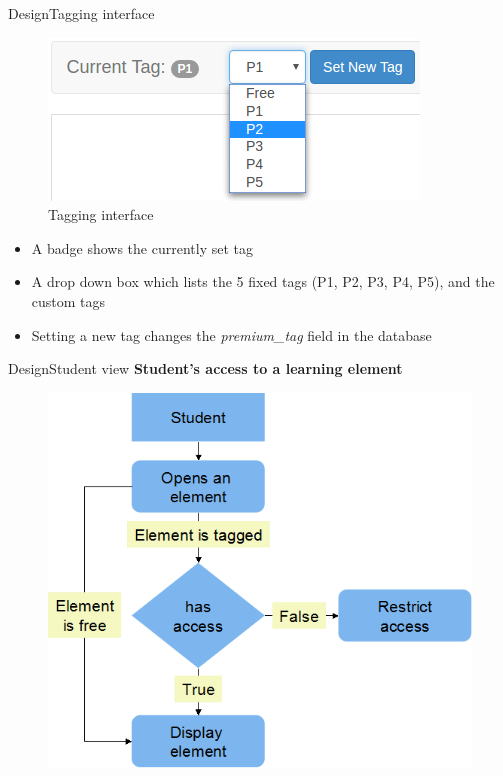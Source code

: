 \documentclass[xcolor=table]{beamer}
\begin{document}
\begin{frame}{Design}{Tagging interface}
	\begin{figure}
	\centering
	\includegraphics[width=0.5\linewidth]{./media/tag_ui}
	\caption{Tagging interface}
	\label{fig:tag_ui}\vspace{-0.2in}
	\end{figure}
	\begin{itemize}
		\item A badge shows the currently set tag
		\item A drop down box which lists the 5 fixed tags (P1, P2, P3, P4, P5), and the custom tags
		\item Setting a new tag changes the \textit{premium\_tag} field in the database
	\end{itemize}
\end{frame}

\begin{frame}{Design}{Student view}
	\textbf{Student's access to a learning element}
	\begin{figure}
	\centering
	\includegraphics[width=0.6\linewidth]{./media/ACdfd}
	\label{fig:ACdfd}
	\end{figure}
\end{frame}
\end{document}
